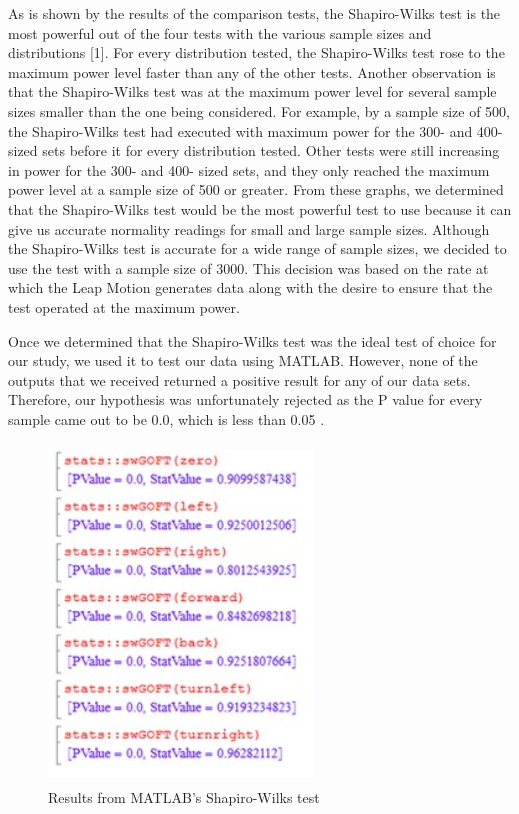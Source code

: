 \documentclass[letterpaper,english, 12pt]{article}
\begin{document}
As is shown by the results of the comparison tests, the Shapiro-Wilks test is the most powerful out of the four tests with the various sample sizes and distributions [1]. For every distribution tested, the Shapiro-Wilks test rose to the maximum power level faster than any of the other tests. Another observation is that the Shapiro-Wilks test was at the maximum power level for several sample sizes smaller than the one being considered. For example, by a sample size of 500, the Shapiro-Wilks test had executed with maximum power for the 300- and 400- sized sets before it for every distribution tested. Other tests were still increasing in power for the 300- and 400- sized sets, and they only reached the maximum power level at a sample size of 500 or greater. From these graphs, we determined that the Shapiro-Wilks test would be the most powerful test to use because it can give us accurate normality readings for small and large sample sizes. Although the Shapiro-Wilks test is accurate for a wide range of sample sizes, we decided to use the test with a sample size of 3000. This decision was based on the rate at which the Leap Motion generates data along with the desire to ensure that the test operated at the maximum power.

Once we determined that the Shapiro-Wilks test was the ideal test of choice for our study, we used it to test our data using MATLAB. However, none of the outputs that we received returned a positive result for any of our data sets. Therefore, our hypothesis was unfortunately rejected as the P value for every sample came out to be 0.0, which is less than 0.05 \cite{cit2}.

\begin{figure}[t]
	\centering
	\includegraphics[height=9cm,width=70mm]{pics/swMatlab.jpg}
	\caption{Results from MATLAB's Shapiro-Wilks test}
\end{figure}
\end{document}
